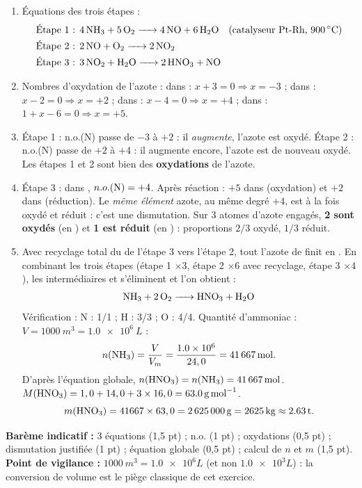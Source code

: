 \documentclass[11pt]{article}
\newcommand{\cle}[1]{{\popxbold\color{popdark}#1}}
\begin{document}
\begin{corrige}
\begin{enumerate}
\item Équations des trois étapes :
\begin{align*}
\text{Étape 1 : } & \ce{4 NH3 + 5 O2 -> 4 NO + 6 H2O} \quad (\text{catalyseur Pt-Rh, } \SI{900}{\celsius})\\
\text{Étape 2 : } & \ce{2 NO + O2 -> 2 NO2}\\
\text{Étape 3 : } & \ce{3 NO2 + H2O -> 2 HNO3 + NO}
\end{align*}
\item Nombres d'oxydation de l'azote : dans  : $x + 3 = 0 \Rightarrow x = -3$ ; dans  : $x - 2 = 0 \Rightarrow x = +2$ ; dans  : $x - 4 = 0 \Rightarrow x = +4$ ; dans  : $1 + x - 6 = 0 \Rightarrow x = +5$.
\item Étape 1 : n.o.(N) passe de $-3$ à $+2$ : il \emph{augmente}, l'azote est oxydé. Étape 2 : n.o.(N) passe de $+2$ à $+4$ : il augmente encore, l'azote est de nouveau oxydé. Les étapes 1 et 2 sont bien des \textbf{oxydations} de l'azote.
\item Étape 3 : dans , $n.o.(\ce{N}) = +4$. Après réaction : $+5$ dans  (oxydation) et $+2$ dans  (réduction). Le \emph{même élément} azote, au même degré $+4$, est à la fois oxydé et réduit : c'est une \cle{dismutation}. Sur 3 atomes d'azote engagés, \textbf{2 sont oxydés} (en ) et \textbf{1 est réduit} (en ) : proportions $2/3$ oxydé, $1/3$ réduit.
\item Avec recyclage total du  de l'étape 3 vers l'étape 2, tout l'azote de  finit en . En combinant les trois étapes (étape 1 $\times 3$, étape 2 $\times 6$ avec recyclage, étape 3 $\times 4$), les intermédiaires  et  s'éliminent et l'on obtient :
\[ \ce{NH3 + 2 O2 -> HNO3 + H2O} \]
Vérification : N : 1/1 ; H : 3/3 ; O : 4/4.
Quantité d'ammoniac : $V = \SI{1000}{m^3} = \SI{1,0e6}{L}$ :
\[ n(\ce{NH3}) = \dfrac{V}{V_m} = \dfrac{\num{1,0e6}}{24,0} = \SI{41667}{mol}. \]
D'après l'équation globale, $n(\ce{HNO3}) = n(\ce{NH3}) = \SI{41667}{mol}$.
$M(\ce{HNO3}) = 1,0 + 14,0 + 3 \times 16,0 = \SI{63,0}{g.mol^{-1}}$.
\[ m(\ce{HNO3}) = 41667 \times 63,0 = \SI{2625000}{g} = \SI{2625}{kg} \approx \SI{2,63}{t}. \]
\end{enumerate}
\textbf{Barème indicatif :} 3 équations (1,5 pt) ; n.o. (1 pt) ; oxydations (0,5 pt) ; dismutation justifiée (1 pt) ; équation globale (0,5 pt) ; calcul de $n$ et $m$ (1,5 pt).
\textbf{Point de vigilance :} $\SI{1000}{m^3} = \num{1,0e6}{L}$ (et non $\num{1,0e3}{L}$) : la conversion de volume est le piège classique de cet exercice.
\end{corrige}
\end{document}
